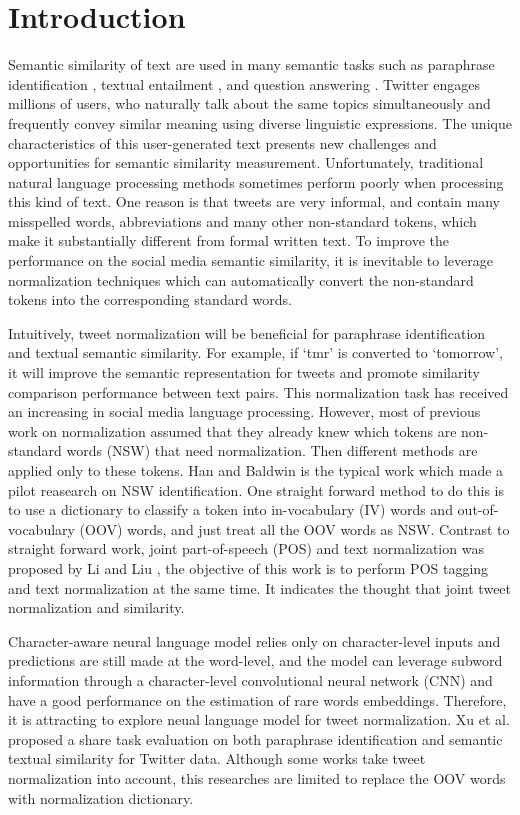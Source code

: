 \documentclass[letterpaper]{article}
\begin{document}
\section{Introduction}
Semantic similarity of text are used in many semantic tasks such as paraphrase identification \cite{Xu-EtAl-2014:TACL}, textual entailment \cite{henderson-popa:2016:P16-1}, and question answering \cite{Severyn:2015:LRS:2766462.2767738}. Twitter engages millions of users, who naturally talk about the same topics simultaneously and frequently convey similar meaning using diverse linguistic expressions. The unique characteristics of this user-generated text presents new challenges and opportunities for semantic similarity measurement. Unfortunately, traditional natural language processing methods sometimes perform poorly when processing this kind of text. One reason is that tweets are very informal, and contain many misspelled words, abbreviations and many other non-standard tokens, which make it substantially different from formal written text. To improve the performance on the social media semantic similarity, it is inevitable to leverage normalization techniques which can automatically convert the non-standard tokens into the corresponding standard words.

Intuitively, tweet normalization will be beneficial for paraphrase identification and textual  semantic similarity. For example, if `tmr' is converted to `tomorrow', it will improve the semantic representation for tweets and promote similarity comparison performance between text pairs. This normalization task has received an increasing in social media language processing. However, most of previous work on normalization assumed that they already knew which tokens are non-standard words (NSW) that need normalization. Then different methods are applied only to these tokens. Han and Baldwin  is the typical work which made a pilot reasearch on NSW identification. One straight forward method to do this is to use a dictionary to classify a token into in-vocabulary (IV) words and out-of-vocabulary (OOV) words, and just treat all the OOV words as NSW. Contrast to straight forward work, joint part-of-speech (POS) and text normalization was proposed by Li and Liu , the objective of this work is to perform POS tagging and text normalization at the same time. It indicates the thought that joint tweet normalization and similarity.

Character-aware neural language model \cite{Kim-AAAI1612489} relies only on character-level inputs and predictions are still made at the word-level, and the model can leverage subword information through a character-level convolutional neural network (CNN) and have a good performance on the estimation of rare words embeddings. Therefore, it is attracting to explore neual language model for tweet normalization. Xu et al.  proposed a share task evaluation on both  paraphrase identification and semantic textual similarity for Twitter data. Although some works \cite{zarrella-EtAl:2015:SemEval,vandergoot-vannoord:2015:SemEval} take tweet normalization into account, this researches are limited to replace the OOV words with normalization dictionary.
\end{document}
